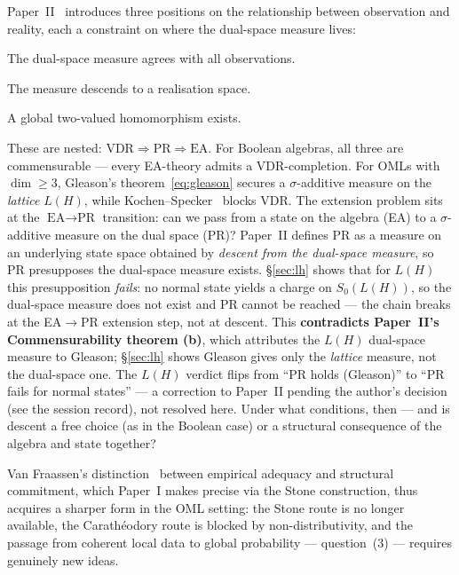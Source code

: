 \documentclass[11pt]{article}
\theoremstyle{definition}
\begin{document}
Paper~II~\cite{MahonPaperII2026} introduces three positions on the
relationship between observation and reality, each a constraint on
where the dual-space measure lives:
\begin{description}[style=nextline, font=\normalfont\bfseries,
    labelwidth=3.5cm, leftmargin=4cm]
  \item[Empirical adequacy (EA)]
    The dual-space measure agrees with all observations.
  \item[Probabilistic realism (PR)]
    The measure descends to a realisation space.
  \item[Value-definite realism (VDR)]
    A global two-valued homomorphism exists.
\end{description}
These are nested: $\text{VDR} \Rightarrow \text{PR}
\Rightarrow \text{EA}$.  For Boolean algebras, all three are
commensurable --- every EA-theory admits a VDR-completion.  For
OMLs with $\dim \geq 3$, Gleason's
theorem~\eqref{eq:gleason} secures a $\sigma$-additive measure on the
\emph{lattice} $L(H)$, while
Kochen--Specker~\cite{KochenSpecker1967} blocks VDR.  The
extension problem sits at the $\text{EA} \to \text{PR}$ transition:
can we pass from a state on the algebra (EA) to a
$\sigma$-additive measure on the dual space (PR)?  Paper~II defines PR
as a measure on an underlying state space obtained by \emph{descent
from the dual-space measure}, so PR presupposes the dual-space measure
exists.  \S\ref{sec:lh} shows that for $L(H)$ this presupposition
\emph{fails}: no normal state yields a charge on $S_0(L(H))$, so the
dual-space measure does not exist and PR cannot be reached --- the
chain breaks at the EA${\to}$PR extension step, not at descent.  This
\textbf{contradicts Paper~II's Commensurability theorem (b)}, which
attributes the $L(H)$ dual-space measure to Gleason; \S\ref{sec:lh}
shows Gleason gives only the \emph{lattice} measure, not the dual-space
one.  The $L(H)$ verdict flips from ``PR holds (Gleason)'' to ``PR
fails for normal states'' --- a correction to Paper~II pending the
author's decision (see the session record), not resolved here.  Under
what conditions, then --- and is descent a free choice (as in the
Boolean case) or a structural consequence of the algebra and state
together?

Van Fraassen's distinction~\cite{vanFraassen1980} between
empirical adequacy and structural commitment, which Paper~I makes
precise via the Stone construction, thus acquires a sharper form
in the OML setting: the Stone route is no longer available, the
Carath\'{e}odory route is blocked by non-distributivity, and the
passage from coherent local data to global probability ---
question~(3) --- requires genuinely new ideas.
\end{document}
